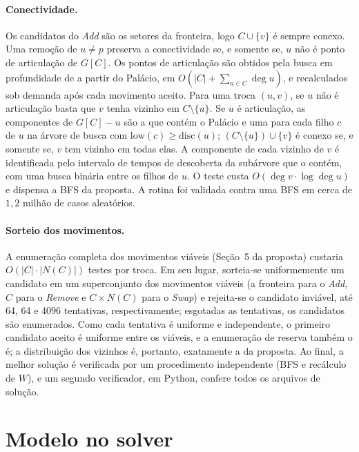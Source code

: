\documentclass[11pt,a4paper]{article}
\begin{document}
\paragraph{Conectividade.} Os candidatos do \emph{Add} são os setores da
fronteira, logo $C\cup\{v\}$ é sempre conexo. Uma remoção de $u\neq p$
preserva a conectividade se, e somente se, $u$ não é ponto de articulação de
$G[C]$. Os pontos de articulação são obtidos pela busca em profundidade de
\citet{Tarjan1972} a partir do Palácio, em $O(|C|+\sum_{u\in C}\deg u)$, e
recalculados sob demanda após cada movimento aceito. Para uma troca $(u,v)$,
se $u$ não é articulação basta que $v$ tenha vizinho em $C\setminus\{u\}$.
Se $u$ é articulação, as componentes de $G[C]-u$ são a que contém o Palácio
e uma para cada filho $c$ de $u$ na árvore de busca com
$\mathrm{low}(c)\geq\mathrm{disc}(u)$; $(C\setminus\{u\})\cup\{v\}$ é conexo
se, e somente se, $v$ tem vizinho em todas elas. A componente de cada
vizinho de $v$ é identificada pelo intervalo de tempos de descoberta da
subárvore que o contém, com uma busca binária entre os filhos de $u$. O teste
custa $O(\deg v\cdot\log\deg u)$ e dispensa a BFS da proposta. A rotina foi
validada contra uma BFS em cerca de $1{,}2$ milhão de casos aleatórios.

\paragraph{Sorteio dos movimentos.} A enumeração completa dos movimentos
viáveis (Seção~5 da proposta) custaria $O(|C|\cdot|N(C)|)$ testes por troca.
Em seu lugar, sorteia-se uniformemente um candidato em um superconjunto dos
movimentos viáveis (a fronteira para o \emph{Add}, $C$ para o \emph{Remove} e
$C\times N(C)$ para o \emph{Swap}) e rejeita-se o candidato inviável, até
64, 64 e 4096 tentativas, respectivamente; esgotadas as tentativas, os
candidatos são enumerados. Como cada tentativa é uniforme e independente, o
primeiro candidato aceito é uniforme entre os viáveis, e a enumeração de
reserva também o é; a distribuição dos vizinhos é, portanto, exatamente a da
proposta. Ao final, a melhor solução é verificada por um procedimento
independente (BFS e recálculo de $W$), e um segundo verificador, em Python,
confere todos os arquivos de solução.

\section{Modelo no solver}\label{sec:solver}
\end{document}
